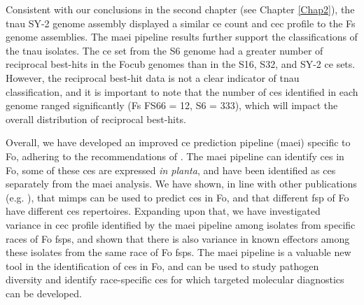 Consistent with our conclusions in the second chapter (see Chapter \ref{Chap2}), the \ac{tnau} SY-2 genome assembly displayed a similar \ac{ce} count and \ac{cec} profile to the \ac{Fs} genome assemblies. The \ac{maei} pipeline results further support the classifications of the \ac{tnau} isolates. The \ac{ce} set from the S6 genome had a greater number of reciprocal best-hits in the \ac{Focub} genomes than in the S16, S32, and SY-2 \ac{ce} sets. However, the reciprocal best-hit data is not a clear indicator of \ac{tnau} classification, and it is important to note that the number of \acp{ce} identified in each genome ranged significantly (\ac{Fs} FS66 = 12, S6 = 333), which will impact the overall distribution of reciprocal best-hits. 

Overall, we have developed an improved \acl{ce} prediction pipeline (\ac{maei}) specific to \ac{Fo}, adhering to the recommendations of \textcite{Sperschneider2015, LoPresti2015, Todd2022}. The \ac{maei} pipeline can identify \acp{ce} in \ac{Fo}, some of these \acp{ce} are expressed \textit{in planta}, and have been identified as \acp{ce} separately from the \ac{maei} analysis. We have shown, in line with other publications (e.g. \textcite{Schmidt2013, Dam2016, FoEC2}), that  \acp{mimp} can be used to predict \acp{ce} in \ac{Fo}, and that different \ac{fsp} of \ac{Fo} have different \acp{ce} repertoires. Expanding upon that, we have investigated variance in \ac{cec} profile identified by the \ac{maei} pipeline among isolates from specific races of \ac{Fo} \acp{fsp}, and shown that there is also variance in known effectors among these isolates from the same race of \ac{Fo} \acp{fsp}. The \ac{maei} pipeline is a valuable new tool in the identification of \acp{ce} in \ac{Fo}, and can be used to study pathogen diversity and identify race-specific \acp{ce} for which targeted molecular diagnostics can be developed. 